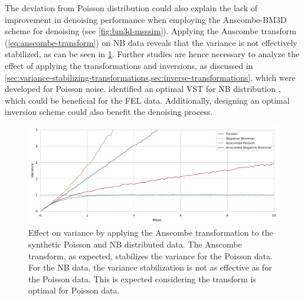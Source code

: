 The deviation from Poisson distribution could also explain the lack of improvement in denoising performance when employing the Anscombe-BM3D scheme for denoising (see \cref{fig:bm3d-msssim}). Applying the Anscombe transform (\cref{eq:anscombe-transform}) on \gls{NB} data reveals that the variance is not effectively stabilized, as can be seen in \cref{fig:data-transform-anscombe-nb}. Further studies are hence necessary to analyze the effect of applying the transformations and inversions, as discussed in \cref{sec:variance-stabilizing-transformations,sec:inverse-transformations}, which were developed for Poisson noise. \citeauthor{anscombeTransformationPoissonBinomial1948} identified an optimal \gls{VST} for \gls{NB} distribution \cite{anscombeTransformationPoissonBinomial1948}, which could be beneficial for the \gls{FEL} data. Additionally, designing an optimal inversion scheme could also benefit the denoising process.

\begin{figure}
    \centering
    \includegraphics[width=1\linewidth]{images/data_transform_anscombe_nb.pdf}
    \caption{Effect on variance by applying the Anscombe transformation to the synthetic Poisson and \gls{NB} distributed data. The Anscombe transform, as expected, stabilizes the variance for the Poisson data. For the \gls{NB} data, the variance stabilization is not as effective as for the Poisson data. This is expected considering the transform is optimal for Poisson data.}
    \label{fig:data-transform-anscombe-nb}
\end{figure}